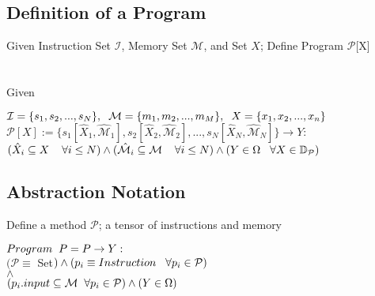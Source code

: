 \documentclass[11pt]{article}
\begin{document}
\subsection{Definition of a Program}
Given Instruction Set $\mathcal{I}$, Memory Set $\mathcal{M}$, and Set $X$; Define Program $\mathcal{P}$[X]\\\\\\
Given
\begin{center}
\vspace{1mm}
$
\mathcal{I} = \{ s_1,s_2,...,s_N\}, \hspace{2mm} \mathcal{M} = \{ m_1,m_2,...,m_M\}, \hspace{2mm} X = \{x_1,x_2,...,x_n\}
$
\\ \vspace{4mm}
$
\mathcal{P}[X] := \{s_1[\hat{X}_1,\hat{\mathcal{M}}_1],s_2[\hat{X}_2,\hat{\mathcal{M}}_2],...,s_{N}[\hat{X}_N,\hat{\mathcal{M}}_N]\}  \rightarrow Y:
$
\\ \vspace{2mm}
$
(\hat{X}_i \subseteq X \hspace{4mm} \forall i \leq N) \land (\hat{\mathcal{M}}_i \subseteq \mathcal{M} \hspace{4mm} \forall i \leq N) \land (Y \in \Omega \hspace{3mm} \forall X \in \mathbb{D}_{\mathcal{P}})
$
\end{center}




\subsection{Abstraction Notation}
Define a method $\mathcal{P}$; a tensor of instructions and memory
\begin{center}
$
Program \hspace{2mm} P = P \rightarrow Y :
$
\\ \vspace{2mm}
$
(\mathcal{P} \equiv$ Set$)\land(p_i \equiv Instruction \hspace{3mm} \forall p_i \in \mathcal{P})
$
\\ \vspace{2mm}
$
\land
$
\\ \vspace{2mm}
$
(p_i.input \subseteq \mathcal{M} \hspace{2mm}  \forall p_i \in \mathcal{P})\land(Y \in \Omega)
$
\end{center}
\end{document}
